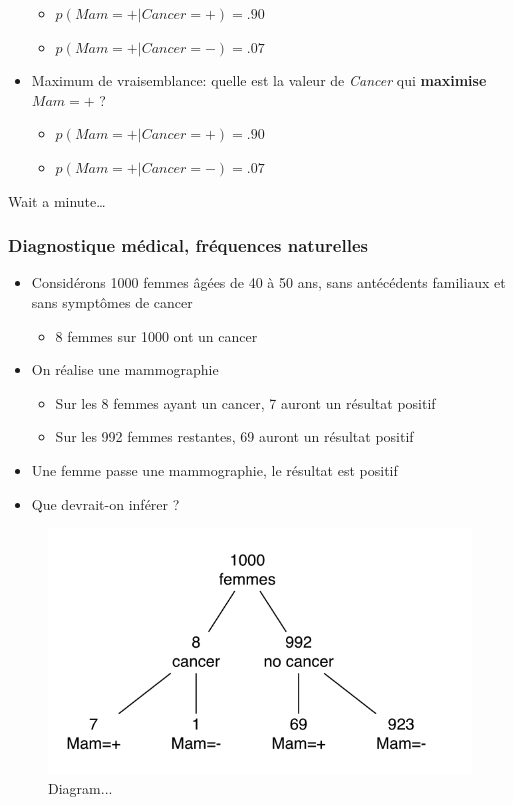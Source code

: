 \documentclass[
  a4paper,11pt,twoside,onecolumn,openright,final,oldfontcommands]{memoir}
\providecommand{\tightlist}{%
  \setlength{\itemsep}{0pt}\setlength{\parskip}{0pt}}
\theoremstyle{definition}
\theoremstyle{definition}
\theoremstyle{definition}
\theoremstyle{definition}
\theoremstyle{remark}
\begin{document}
\begin{itemize}
  \begin{itemize}
  \tightlist
  \item
    \(p(Mam=+|Cancer=+)=.90\)
  \item
    \(p(Mam=+|Cancer=-)=.07\)
  \end{itemize}
\item
  Maximum de vraisemblance: quelle est la valeur de \emph{Cancer} qui \textbf{maximise} \(Mam=+\) ?

  \begin{itemize}
  \tightlist
  \item
    \(p(Mam=+|Cancer=+)=.90\)
  \item
    \sout{\(p(Mam=+|Cancer=-)=.07\)}
  \end{itemize}
\end{itemize}

Wait a minute\ldots{}

\hypertarget{diagnostique-muxe9dical-fruxe9quences-naturelles}{%
\subsubsection{Diagnostique médical, fréquences naturelles}\label{diagnostique-muxe9dical-fruxe9quences-naturelles}}

\begin{itemize}
\tightlist
\item
  Considérons 1000 femmes âgées de 40 à 50 ans, sans antécédents familiaux et sans symptômes de cancer

  \begin{itemize}
  \tightlist
  \item
    8 femmes sur 1000 ont un cancer
  \end{itemize}
\item
  On réalise une mammographie

  \begin{itemize}
  \tightlist
  \item
    Sur les 8 femmes ayant un cancer, 7 auront un résultat positif
  \item
    Sur les 992 femmes restantes, 69 auront un résultat positif
  \end{itemize}
\item
  Une femme passe une mammographie, le résultat est positif
\item
  Que devrait-on inférer ?
\end{itemize}

\begin{figure}[!htb]

{\centering \includegraphics[width=0.5\linewidth]{figures/diagram} 

}

\caption{Diagram...}\label{fig:diagram}
\end{figure}
\end{document}
